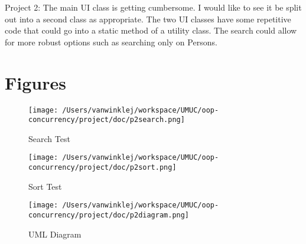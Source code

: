 \documentclass[english,floatsintext,man]{apa6}
\begin{document}
Project 2: The main UI class is getting cumbersome. I would like to see
it be split out into a second class as appropriate. The two UI classes
have some repetitive code that could go into a static method of a
utility class. The search could allow for more robust options such as
searching only on Persons.

\section{Figures}\label{figures}

\begin{figure}[htbp]
\centering
\texttt{[image: /Users/vanwinklej/workspace/UMUC/oop-concurrency/project/doc/p2search.png]}
\caption{Search Test}
\end{figure}

\begin{figure}[htbp]
\centering
\texttt{[image: /Users/vanwinklej/workspace/UMUC/oop-concurrency/project/doc/p2sort.png]}
\caption{Sort Test}
\end{figure}

\begin{figure}[htbp]
\centering
\texttt{[image: /Users/vanwinklej/workspace/UMUC/oop-concurrency/project/doc/p2diagram.png]}
\caption{UML Diagram}
\end{figure}

\setlength{\parindent}{-0.5in} \setlength{\leftskip}{0.5in}
\end{document}
